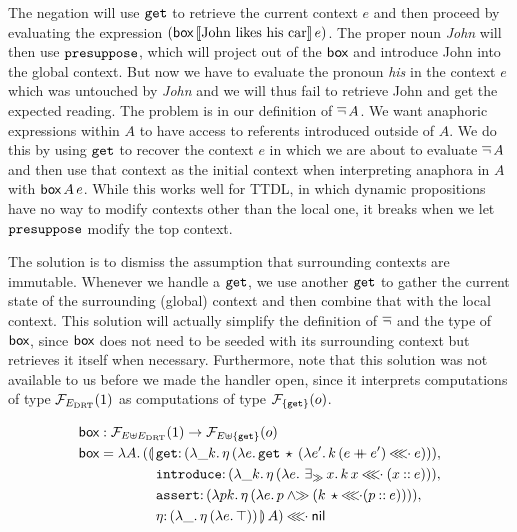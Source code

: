 The negation will use $\mathtt{get}$ to retrieve the current context $e$ and
then proceed by evaluating the expression
$(\textsf{box}\,\llbracket \text{John likes his car} \rrbracket\,e)$. The proper noun
\emph{John} will then use $\mathtt{presuppose}$, which will project out of the
$\textsf{box}$ and introduce John into the global context. But now we have to
evaluate the pronoun \emph{his} in the context $e$ which was untouched by
\emph{John} and we will thus fail to retrieve John and get the expected
reading. The problem is in our definition of $\mathop{\overline{\lnot}} A$. We want anaphoric
expressions within $A$ to have access to referents introduced outside of
$A$. We do this by using $\mathtt{get}$ to recover the context $e$ in which we
are about to evaluate $\mathop{\overline{\lnot}} A$ and then use that context as the initial
context when interpreting anaphora in $A$ with $\textsf{box}\,A\,e$. While
this works well for TTDL, in which dynamic propositions have no way to
modify contexts other than the local one, it breaks when we let
$\mathtt{presuppose}$ modify the top context.

The solution is to dismiss the assumption that surrounding contexts are
immutable. Whenever we handle a $\mathtt{get}$, we use another $\mathtt{get}$ to
gather the current state of the surrounding (global) context and then
combine that with the local context. This solution will actually simplify
the definition of $\mathop{\overline{\lnot}}$ and the type of $\textsf{box}$, since $\textsf{box}$ does not
need to be seeded with its surrounding context but retrieves it itself when
necessary. Furthermore, note that this solution was not available to us
before we made the handler open, since it interprets computations of type
$\mathcal{F}_{E_{\mathrm{DRT}}}(1)$ as computations of type $\mathcal{F}_{\{\mathtt{get}\}}(o)$.

\begin{align*}
  &\BOX :\FF_{E \uplus E_\DRT}(1) \to \FF_{E \uplus \{\op{get}\}}(o) \\
  &\BOX = \lam{A}{(\ap{\begin{aligned}[t]\lban
  &\onto{\op{get}}{(\lam{\_ k}{\etaE{(\lam{e}{\app{\op{get}}{\star}{(\lam{e'}{\ap{k}{(e \cat e')} \apll e})}})}})}, \\
  &\onto{\op{introduce}}{(\lam{\_ k}{\etaE{(\lam{e}{\existsr x.\, \ap{k}{x} \apll (x \cons e)})}})}, \\
  &\onto{\op{assert}}{(\lam{p k}{\etaE{(\lam{e}{p \andr (\ap{k}{\star} \apll (p \cons e))})}})}, \\
  &\onto{\eta}{(\lam{\_}{\etaE{(\lam{e}{\top})}})}\rban}{A}) \apll \nil
    \end{aligned}}
\end{align*}

